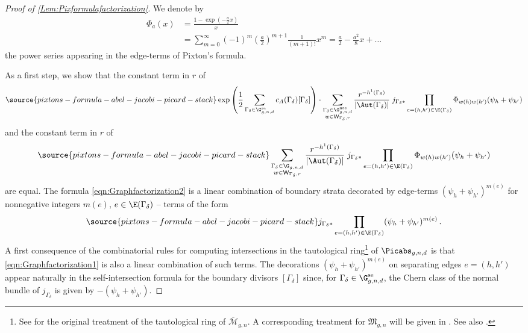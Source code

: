 \begin{proof}[Proof of \cref{Lem:Pixformulafactorization}]
We denote by
\begin{align*}
\Phi_{a}(x)&= \frac{1-\exp({-\frac{a}{2}}x)}{x}\\ &= \sum_{m=0}^\infty (-1)^m (\frac{a}{2})^{m+1} \frac{1}{(m+1)!}x^m = \frac{a}{2} - \frac{a^2}{8} x + \ldots
\end{align*}
the power series appearing in the edge-terms of Pixton's formula.

As a first step, we show that the constant term in $r$ of
\begin{equation} \label{eqn:Graphfactorization1}
\source{pixtons-formula-abel-jacobi-picard-stack}
    \exp\left(\frac12  \sum_{\Gamma_\delta \in \G_{g,n,d}^\textup{se}} c_A(\Gamma_\delta) [\Gamma_\delta]  \right) \cdot \sum_{
\substack{\Gamma_\delta\in \G_{g,n,d}^\textup{nse} \\
w\in \mathsf{W}_{\Gamma_\delta,r}}
}
\frac{r^{-h^1(\Gamma_\delta)}}{|\Aut(\Gamma_\delta)| }
\;
j_{\Gamma_\delta*} \prod_{e=(h,h')\in \E(\Gamma_\delta)}
 \Phi_{w(h)w(h')}(\psi_h+\psi_{h'})
\end{equation}
and the constant term in $r$ of
\begin{equation} \label{eqn:Graphfactorization2}
\source{pixtons-formula-abel-jacobi-picard-stack}
\sum_{
\substack{\Gamma_\delta\in \G_{g,n,d} \\
w\in \mathsf{W}_{\Gamma_\delta,r}}
}
\frac{r^{-h^1(\Gamma_\delta)}}{|\Aut(\Gamma_\delta)| }
\;
j_{\Gamma_\delta*} \prod_{e=(h,h')\in \E(\Gamma_\delta)}
 \Phi_{w(h)w(h')}(\psi_h+\psi_{h'})
\end{equation}
are equal. The formula \eqref{eqn:Graphfactorization2} is a linear combination of boundary strata decorated by edge-terms $(\psi_h + \psi_{h'})^{m(e)}$ for nonnegative integers $m(e)$, $e \in \E(\Gamma_\delta)$ -- terms of the form
\begin{equation} \label{eqn:Graphfactorization3}
\source{pixtons-formula-abel-jacobi-picard-stack}
 j_{\Gamma_\delta*} \prod_{e=(h,h')\in \E(\Gamma_\delta)}
 (\psi_h+\psi_{h'})^{m(e)}\, .
\end{equation}
A first consequence of the combinatorial rules for computing intersections in the tautological ring\footnote{See \cite{GraberPandharipande} for the original treatment of the tautological ring of $\overline{\mathcal{M}}_{g,n}$. A corresponding treatment for $\mathfrak{M}_{g,n}$ will be given in \cite{BaeSchmitt1,BaeSchmitt2}. See also \cite[Sections 1.1, 1.7]{Janda2018Double-ramifica}.} of $\Picabs_{g,n,d}$ is that \eqref{eqn:Graphfactorization1} is also a linear combination of such terms. The decorations $(\psi_h+\psi_{h'})^{m(e)}$ on separating edges $e=(h,h')$ appear naturally in the self-intersection formula for the boundary divisors $[\Gamma_\delta]$ since, for $\Gamma_\delta \in \G_{g,n,d}^\textup{se}$, the Chern class of the normal bundle of $j_{\Gamma_\delta}$ is given by $- (\psi_h + \psi_{h'})$.


\end{proof}
